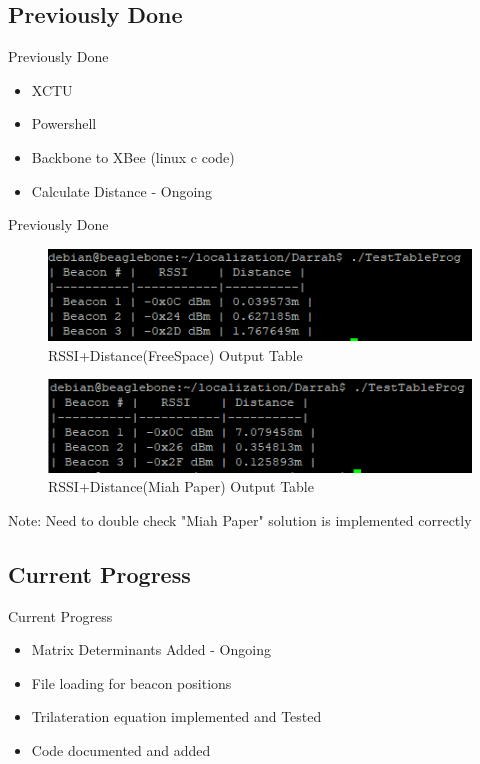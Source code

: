 \documentclass{beamer}
\begin{document}

\subsection{Previously Done}
\begin{frame}{Previously Done}
    \begin{itemize}
    \item XCTU
    \item Powershell
    \item Backbone to XBee (linux c code)
    \item Calculate Distance - Ongoing
    \end{itemize}
\end{frame}

\begin{frame}{Previously Done}
    \begin{figure}
    \centering
    \includegraphics[scale=0.8]{figs/ScreenShots/RSSIOutputTableDist.PNG}
    \caption{RSSI+Distance(FreeSpace) Output Table}
    \label{fig:RSSIOutputTable_Darrah}
    \end{figure}
    
    \begin{figure}
    \centering
    \includegraphics[scale=0.8]{figs/ScreenShots/RSSIOutputTableDist_2.PNG}
    \caption{RSSI+Distance(Miah Paper) Output Table}
    \label{fig:RSSIOutputTable_Paper}
    \end{figure}
    
    Note: Need to double check "Miah Paper" solution is implemented correctly
\end{frame}


\subsection{Current Progress}
\begin{frame}{Current Progress}
    \begin{itemize}
    \item Matrix Determinants Added - Ongoing
    \item File loading for beacon positions
    \item Trilateration equation implemented and Tested
    \item Code documented and added
    \end{itemize}
\end{frame}
\end{document}
